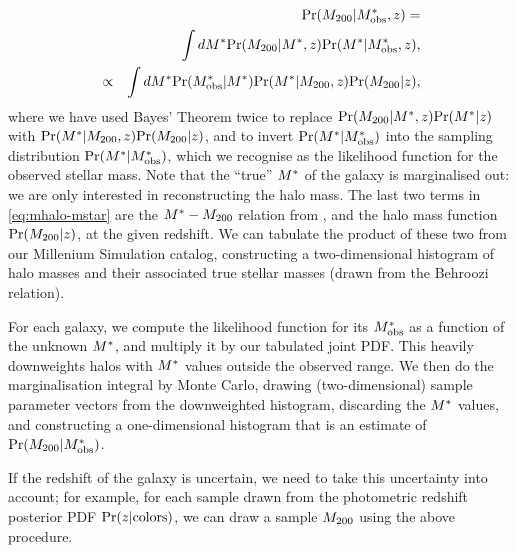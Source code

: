 \documentclass[useAMS,usenatbib]{mn2e}
\begin{document}
\begin{eqnarray}
&& \Pr(\Mhalo|\Mstarobs,z) = \notag\\
&& \int d\Mstar \Pr(\Mhalo|\Mstar,z) \Pr(\Mstar|\Mstarobs,z), \notag\\
&\propto& \int d\Mstar \Pr(\Mstarobs|\Mstar) \Pr(\Mstar|\Mhalo,z) \Pr(\Mhalo|z),
\label{eq:mhalo-mstar}
\end{eqnarray}
where we have used Bayes' Theorem twice to replace
$\Pr(\Mhalo|\Mstar,z) \Pr(\Mstar|z)$ with 
$\Pr(\Mstar|\Mhalo,z) \Pr(\Mhalo|z)$, and 
to invert $\Pr(\Mstar|\Mstarobs)$ into the sampling
distribution $\Pr(\Mstar|\Mstarobs)$, which we recognise as the likelihood
function for the observed stellar mass. Note that the ``true'' $\Mstar$ of the
galaxy is marginalised out: we are only interested in reconstructing the halo
mass. The last two terms in
\eqref{eq:mhalo-mstar} are the $\Mstar-\Mhalo$ relation from
\citet{BehrooziEtal2010}, and the halo mass function $\Pr(\Mhalo|z)$, at the
given redshift. We can
tabulate the product of these two from our Millenium Simulation catalog,
constructing a two-dimensional histogram of halo masses and their associated
true stellar masses (drawn from the Behroozi relation). 

For each galaxy, we compute the likelihood function for its $\Mstarobs$ as a
function of the unknown $\Mstar$, and multiply it by our tabulated joint PDF.
This heavily downweights halos with $\Mstar$ values outside the observed
range. We then do the marginalisation integral by Monte Carlo, drawing
(two-dimensional) sample parameter vectors
from the downweighted histogram, discarding the $\Mstar$ values, and
constructing a one-dimensional histogram that is an estimate of
$\Pr(\Mhalo|\Mstarobs)$.

If the redshift of the galaxy is uncertain, we need to take this uncertainty
into account; for example, for each sample drawn from the photometric redshift
posterior PDF $\Pr(z|{\rm colors})$, we can draw a sample $\Mhalo$ using the
above procedure.








% 

% 
% 




\label{lastpage}
\bsp
\end{document}
